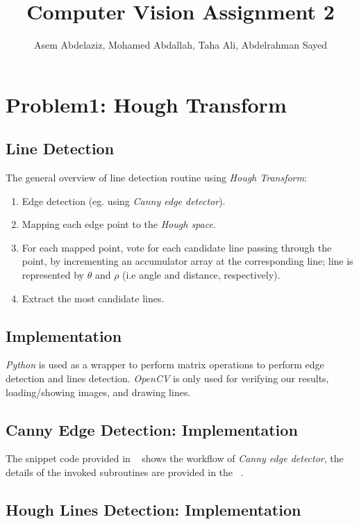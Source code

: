 \documentclass[letterpaper, 10 pt, conference ,onecolumn]{ieeeconf}  %
\title{
Computer Vision Assignment 2
}
\author{
 Asem Abdelaziz,
 Mohamed Abdallah, 
 Taha Ali,
 Abdelrahman Sayed
}
\begin{document}
\maketitle



\section{Problem1: Hough Transform} 
\subsection{Line Detection} 


The general overview of line detection routine using \textit{Hough Transform}:
\begin{enumerate}

\item Edge detection (eg. using \textit{Canny edge detector}).
\item Mapping each edge point to the \textit{Hough space}.
\item For each mapped point, vote for each candidate line passing through the point, by incrementing an accumulator array at the corresponding line; line is represented by $\theta$ and $\rho$ (i.e angle and distance, respectively).
\item Extract the most candidate lines.

\end{enumerate} 
\subsection*{Implementation}

\textit{Python} is used as a wrapper to perform matrix operations to perform edge detection and lines detection. \textit{OpenCV} is only used for verifying our results, loading/showing images, and drawing lines.


\subsection*{Canny Edge Detection: Implementation} 
The snippet code provided in ~ shows the workflow of \textit{Canny edge detector}, the details of the invoked subroutines are provided in the ~.

\subsection*{Hough Lines Detection: Implementation }
\end{document}
